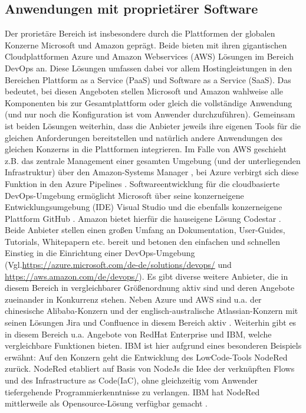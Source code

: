 \subsection{Anwendungen mit proprietärer Software}
\label{Anwendungen mit proprietärer Software}
Der prorietäre Bereich ist insbesondere durch die Plattformen der globalen Konzerne Microsoft und Amazon geprägt. Beide bieten mit ihren gigantischen Cloudplattformen Azure und Amazon Webservices (\acrshort{AWS}) Lösungen im Bereich \gls{DevOps} an. Diese Lösungen umfassen dabei vor allem Hostingleistungen in den Bereichen Plattform as a Service (\acrshort{PaaS}) und Software as a Service (\acrshort{SaaS}). Das bedeutet, bei diesen Angeboten stellen Microsoft und Amazon wahlweise alle Komponenten bis zur Gesamtplattform oder gleich die vollständige Anwendung (und nur noch die Konfiguration ist vom Anwender durchzuführen).
Gemeinsam ist beiden Lösungen weiterhin, dass die Anbieter jeweils ihre eigenen Tools für die gleichen Anforderungen bereitstellen und natürlich andere Anwendungen des gleichen Konzerns in die Plattformen integrieren.
Im Falle von \acrshort{AWS} geschieht z.B. das zentrale Management einer gesamten Umgebung (und der unterliegenden Infrastruktur) über den Amazon-Systems Manager \cite{aws_systems_manager}, bei Azure verbirgt sich diese Funktion in den Azure Pipelines \cite{azure_devops_loesungen}.
Softwareentwicklung für die cloudbasierte \gls{DevOps}-Umgebung ermöglicht Microsoft über seine konzerneigene Entwicklungsumgebung (\acrshort{IDE}) Visual Studio und die ebenfalls konzerneigene Plattform  GitHub \cite{azure_devops_loesungen}. Amazon bietet hierfür die hauseigene Lösung Codestar \cite{aws_codestar}.
Beide Anbieter stellen einen großen Umfang an Dokumentation, User-Guides, Tutorials, Whitepapern etc. bereit und betonen den einfachen und schnellen Einstieg in die Einrichtung einer \gls{DevOps}-Umgebung (Vgl.\url{https://azure.microsoft.com/de-de/solutions/devops/} und \url{https://aws.amazon.com/de/devops/}).\newline
Es gibt diverse weitere Anbieter, die in diesem Bereich in vergleichbarer Größenordnung aktiv sind und deren Angebote zueinander in Konkurrenz stehen. Neben Azure und \acrshort{AWS} sind u.a. der chinesische Alibaba-Konzern \cite{alibaba_devops} und der englisch-australische Atlassian-Konzern mit seinen Lösungen Jira und Confluence in diesem Bereich aktiv \cite{atlassian_jira_nodate}. 
Weiterhin gibt es in diesem Bereich u.a. Angebote von RedHat Enterprise \cite{redhat_openshift_2017} und IBM, welche vergleichbare Funktionen bieten. IBM ist hier aufgrund eines besonderen Beispiels erwähnt: Auf den Konzern geht die Entwicklung des \gls{LowCode}-Tools NodeRed zurück. NodeRed etabliert auf Basis von NodeJs die Idee der verknüpften Flows und des \glqq{}Infrastructure as Code\grqq (\acrshort{IaC}), ohne gleichzeitig vom Anwender tiefergehende Programmierkenntnisse zu verlangen. IBM hat NodeRed mittlerweile als Opensource-Lösung verfügbar gemacht \cite{nodered_about}.
